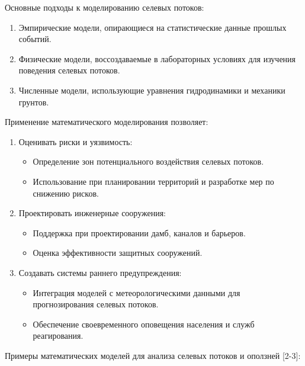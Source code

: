 \begin{multicols}{2}
Основные подходы к моделированию селевых потоков:

\begin{enumerate}
\def\labelenumi{\arabic{enumi}.}
\item
  Эмпирические модели, опирающиеся на статистические данные прошлых
  событий.
\item
  Физические модели, воссоздаваемые в лабораторных условиях для изучения
  поведения селевых потоков.
\item
  Численные модели, использующие уравнения гидродинамики и механики
  грунтов.
\end{enumerate}

Применение математического моделирования позволяет:

\begin{enumerate}
\def\labelenumi{\arabic{enumi}.}
\item
  Оценивать риски и уязвимость:

  \begin{itemize}
  \item
    Определение зон потенциального воздействия селевых потоков.
  \item
    Использование при планировании территорий и разработке мер по
    снижению рисков.
  \end{itemize}
\item
  Проектировать инженерные сооружения:

  \begin{itemize}
  \item
    Поддержка при проектировании дамб, каналов и барьеров.
  \item
    Оценка эффективности защитных сооружений.
  \end{itemize}
\item
  Создавать системы раннего предупреждения:

  \begin{itemize}
  \item
    Интеграция моделей с метеорологическими данными для прогнозирования
    селевых потоков.
  \end{itemize}

  \begin{itemize}
  \item
    Обеспечение своевременного оповещения населения и служб
    реагирования.
  \end{itemize}
\end{enumerate}

Примеры математических моделей для анализа селевых потоков и оползней
{[}2-3{]}:


\end{multicols}
